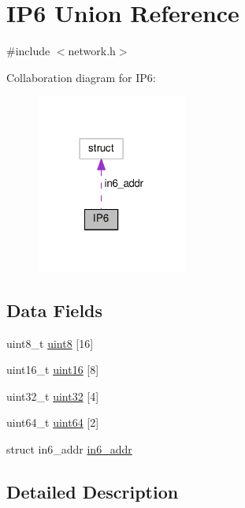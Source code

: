 \hypertarget{union_i_p6}{\section{I\+P6 Union Reference}
\label{union_i_p6}
}


{\ttfamily \#include $<$network.\+h$>$}



Collaboration diagram for I\+P6\+:
\nopagebreak
\begin{figure}[H]
\begin{center}
\leavevmode
\includegraphics[width=141pt]{d9/d33/union_i_p6__coll__graph}
\end{center}
\end{figure}
\subsection*{Data Fields}
\begin{DoxyCompactItemize}
\item 
uint8\+\_\+t \hyperlink{union_i_p6_a6b067d428eefbf1754aa09429b1ba524}{uint8} \mbox{[}16\mbox{]}
\item 
uint16\+\_\+t \hyperlink{union_i_p6_af0f89d2fc8c3ccbcc4fca0156563fcfe}{uint16} \mbox{[}8\mbox{]}
\item 
uint32\+\_\+t \hyperlink{union_i_p6_a1d8ab1f6c1da5565bed41e7095610dea}{uint32} \mbox{[}4\mbox{]}
\item 
uint64\+\_\+t \hyperlink{union_i_p6_a36c7a85cc2c5062edd5ebf13d46fa343}{uint64} \mbox{[}2\mbox{]}
\item 
struct in6\+\_\+addr \hyperlink{union_i_p6_ac312c20ade57f180c50585e9ea42314c}{in6\+\_\+addr}
\end{DoxyCompactItemize}


\subsection{Detailed Description}


